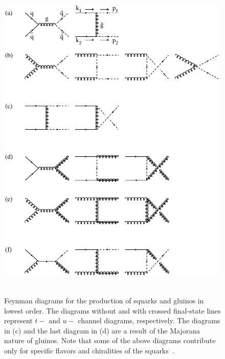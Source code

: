 \begin{figure}[!ht]
\begin{center}
\mbox{
\includegraphics[width=0.995\textwidth]{BeyondSM/Figures/bornfeyn.eps}
}
\end{center}
\caption[Feynman diagrams for the production of squarks and gluinos in lowest order.]{Feynman diagrams for the production of squarks and gluinos in lowest order. The diagrams without and with crossed final-state lines represent $t-$ and $u-$ channel diagrams, respectively. The diagrams in (c) and the last diagram in (d) are a result of the Majorana nature of gluinos. Note that some of the above diagrams contribute only for specific flavors and chiralities of the squarks~\cite{Beenakker:1996ch}.}
\label{fig:SquarkGluinoProductionDiagrams}
\end{figure}

